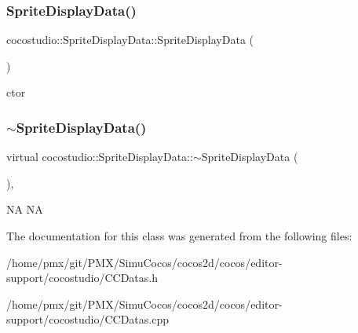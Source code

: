\subsubsection{\texorpdfstring{Sprite\+Display\+Data()}{SpriteDisplayData()}\hspace{0.1cm}{\footnotesize\ttfamily [2/2]}}
{\footnotesize\ttfamily cocostudio\+::\+Sprite\+Display\+Data\+::\+Sprite\+Display\+Data (\begin{DoxyParamCaption}{ }\end{DoxyParamCaption})}

ctor \mbox{\label{classcocostudio_1_1SpriteDisplayData_a84423549b21b67a0bdc73a41052e706c}} 
\subsubsection{\texorpdfstring{$\sim$\+Sprite\+Display\+Data()}{~SpriteDisplayData()}\hspace{0.1cm}{\footnotesize\ttfamily [2/2]}}
{\footnotesize\ttfamily virtual cocostudio\+::\+Sprite\+Display\+Data\+::$\sim$\+Sprite\+Display\+Data (\begin{DoxyParamCaption}{ }\end{DoxyParamCaption})\hspace{0.3cm}{\ttfamily [inline]}, {\ttfamily [virtual]}}

NA  NA 

The documentation for this class was generated from the following files\+:\begin{DoxyCompactItemize}
\item 
/home/pmx/git/\+P\+M\+X/\+Simu\+Cocos/cocos2d/cocos/editor-\/support/cocostudio/C\+C\+Datas.\+h\item 
/home/pmx/git/\+P\+M\+X/\+Simu\+Cocos/cocos2d/cocos/editor-\/support/cocostudio/C\+C\+Datas.\+cpp\end{DoxyCompactItemize}
